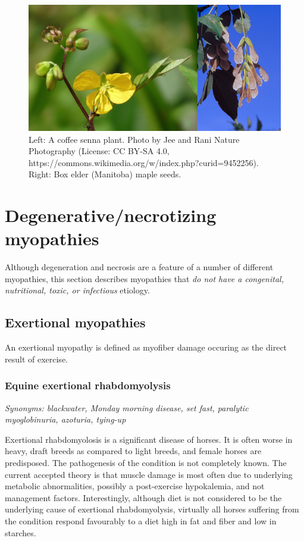 \documentclass[openany]{book}
\begin{document}
\begin{figure}

{\centering \includegraphics[width=0.6\linewidth]{images/plants} 

}

\caption{Left: A coffee senna plant. Photo by Jee and Rani Nature Photography (License: CC BY-SA 4.0, https://commons.wikimedia.org/w/index.php?curid=9452256). Right: Box elder (Manitoba) maple seeds.}\label{fig:plants}
\end{figure}

\chapter{Degenerative/necrotizing
myopathies}\label{degenerativenecrotizing-myopathies}

Although degeneration and necrosis are a feature of a number of
different myopathies, this section describes myopathies that \emph{do
not have a congenital, nutritional, toxic, or infectious} etiology.

\section{Exertional myopathies}\label{exertional-myopathies}

An exertional myopathy is defined as myofiber damage occuring as the
direct result of exercise.

\hypertarget{equine-exertional-rhabdomyolysis}{\subsection{Equine
exertional rhabdomyolysis}\label{equine-exertional-rhabdomyolysis}}

\emph{Synonyms: blackwater, Monday morning disease, set fast, paralytic
myoglobinuria, azoturia, tying-up}

Exertional rhabdomyolosis is a significant disease of horses. It is
often worse in heavy, draft breeds as compared to light breeds, and
female horses are predisposed. The pathogenesis of the condition is not
completely known. The current accepted theory is that muscle damage is
most often due to underlying metabolic abnormalities, possibly a
post-exercise hypokalemia, and not management factors. Interestingly,
although diet is not considered to be the underlying cause of exertional
rhabdomyolysis, virtually all horses suffering from the condition
respond favourably to a diet high in fat and fiber and low in starches.
\end{document}
